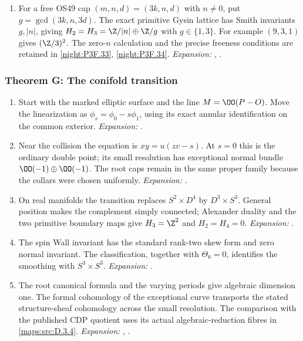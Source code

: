\begin{enumerate}[label=\arabic*.,leftmargin=*]
Together with the cyclic divisor matrix and refined class zero,
these give the single type $M_d$ in \cref{maps:src:D.2.48}.
\textit{Expansion:} .
\item\hypertarget{step-III-F-7}{} For a free OS49 cap $(m,n,d)=(3k,n,d)$ with $n\ne0$,
put $g=\gcd(3k,n,3d)$.  The exact primitive Gysin lattice has
Smith invariants $g,|n|$, giving
$H_2=H_3=\Z/|n|\oplus\Z/g$ with $g\in\{1,3\}$.
For example $(9,3,1)$ gives $(\Z/3)^2$.
The zero-$n$ calculation and the precise freeness conditions are
retained in \cref{night:P3F.33}, \cref{night:P3F.34}.
\textit{Expansion:} , .
\end{enumerate}

\hypertarget{outline-III-G}{}
\subsubsection*{Theorem G: The conifold transition}
\begin{enumerate}[label=\arabic*.,leftmargin=*]
\item\hypertarget{step-III-G-1}{} Start with the marked elliptic surface and the line
$M=\OO(P-O)$.  Move the linearization as $\phi_s=\phi_0-s\phi_1$,
using its exact annular identification on the common exterior.
\textit{Expansion:} .
\item\hypertarget{step-III-G-2}{} Near the collision the equation is
$xy=u(zv-s)$.  At $s=0$ this is the ordinary double point;
its small resolution has exceptional normal bundle
$\OO(-1)\oplus\OO(-1)$.  The root caps remain in the same
proper family because the collars were chosen uniformly.
\textit{Expansion:} .
\item\hypertarget{step-III-G-3}{} On real manifolds the transition replaces $S^2\times D^4$
by $D^3\times S^3$.  General position makes the complement
simply connected; Alexander duality and the two primitive boundary
maps give $H_3=\Z^2$ and $H_2=H_4=0$.
\textit{Expansion:} .
\item\hypertarget{step-III-G-4}{} The spin Wall invariant has the standard rank-two skew form
and zero normal invariant.  The classification, together with
$\Theta_6=0$, identifies the smoothing with $S^3\times S^3$.
\textit{Expansion:} .
\item\hypertarget{step-III-G-5}{} The root canonical formula and the varying periods give
algebraic dimension one.  The formal cohomology of the exceptional
curve transports the stated structure-sheaf cohomology across the
small resolution.  The comparison with the published CDP quotient
uses its actual algebraic-reduction fibres in
\cref{maps:src:D.3.4}.
\textit{Expansion:} , .
\end{enumerate}

